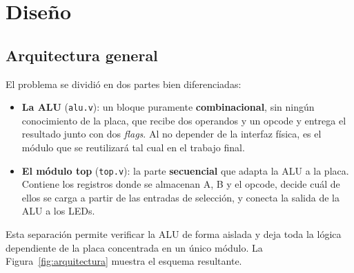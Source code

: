 \section{Diseño}
\subsection{Arquitectura general}
El problema se dividió en dos partes bien diferenciadas:
\begin{itemize}
	\item \textbf{La ALU} (\texttt{alu.v}): un bloque puramente \textbf{combinacional}, sin ningún conocimiento de la placa, que recibe dos operandos y un opcode y entrega el resultado junto con dos \textit{flags}. Al no depender de la interfaz física, es el módulo que se reutilizará tal cual en el trabajo final.
	\item \textbf{El módulo top} (\texttt{top.v}): la parte \textbf{secuencial} que adapta la ALU a la placa. Contiene los registros donde se almacenan A, B y el opcode, decide cuál de ellos se carga a partir de las entradas de selección, y conecta la salida de la ALU a los LEDs.
\end{itemize}

Esta separación permite verificar la ALU de forma aislada y deja toda la lógica dependiente de la placa concentrada en un único módulo. La Figura~\ref{fig:arquitectura} muestra el esquema resultante.

